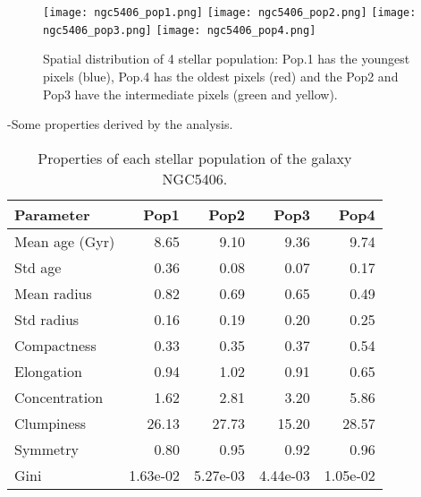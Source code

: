 \begin{figure}[bh]
\begin{center}
\texttt{[image: ngc5406\_pop1.png]}
\texttt{[image: ngc5406\_pop2.png]}
\texttt{[image: ngc5406\_pop3.png]}
\texttt{[image: ngc5406\_pop4.png]}
 \caption{Spatial distribution of 4 stellar population: Pop.1 has the youngest pixels (blue), Pop.4 has the oldest pixels (red) and the Pop2 and Pop3 have the intermediate pixels (green and yellow).}
   \label{fig1}
\end{center}
\end{figure}


-Some properties derived by the analysis.

\begin{table}[h]
\centering
\begin{tabular}{l|r|r|r|r}
Parameter & Pop1 & Pop2 & Pop3 & Pop4 \\\hline
Mean age (Gyr) & 8.65 & 9.10 & 9.36 & 9.74 \\
Std age &0.36 & 0.08 & 0.07 & 0.17 \\
Mean radius & 0.82 & 0.69 & 0.65 & 0.49 \\
Std radius & 0.16 & 0.19 & 0.20 & 0.25 \\
Compactness & 0.33 & 0.35 & 0.37 & 0.54 \\
Elongation & 0.94 & 1.02 & 0.91 & 0.65 \\
Concentration & 1.62  & 2.81 & 3.20 & 5.86 \\
Clumpiness & 26.13  & 27.73 & 15.20 & 28.57 \\
Symmetry & 0.80  & 0.95 & 0.92 & 0.96 \\
Gini & 1.63e-02 & 5.27e-03 & 4.44e-03 & 1.05e-02\\ 

\end{tabular}
\caption{\label{tab:widgets}Properties of each stellar population of the galaxy NGC5406.}
\end{table}

